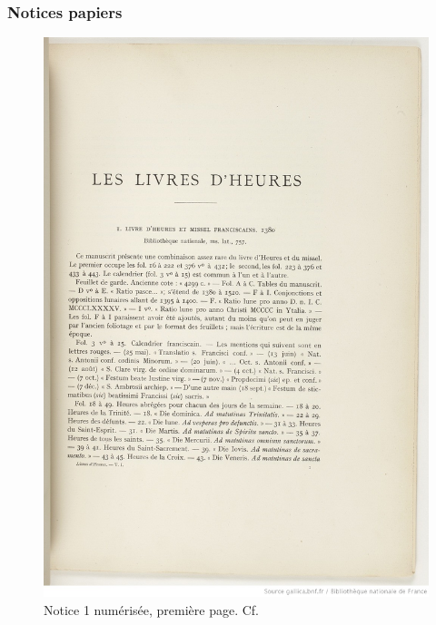 \documentclass[a4paper,12pt,twoside]{book}
\begin{document}
	\subsubsection{\label{notices_papiers}Notices papiers}
	
	
	\begin{figure}[!h]
    \centering
    \includegraphics[width=15cm]{img/Notices_Leroquais/Notice1/Papier/noticepapier_1_1.jpeg}
    \caption{Notice 1 numérisée, première page. Cf. \cite[p. 1]{Leroquais_notices}}
    \end{figure}
    \clearpage
    
\end{document}
